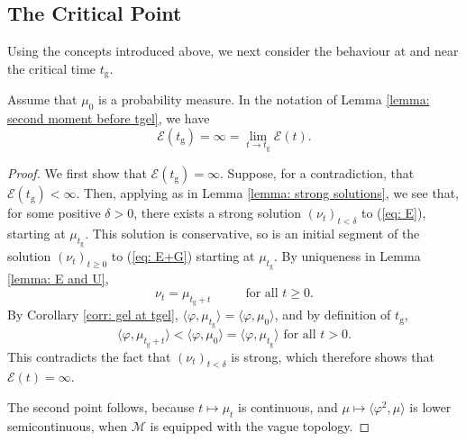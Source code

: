 \subsection{The Critical Point} Using the concepts introduced above, we next consider the behaviour at and near the critical time $t_\mathrm{g}$. \begin{lemma} Assume that $\mu_0$ is a probability measure. In the notation of Lemma \ref{lemma: second moment before tgel}, we have \begin{equation} \mathcal{E}(t_\mathrm{g})=\infty=\lim_{t\rightarrow t_\mathrm{g}} \mathcal{E}(t). \end{equation} \end{lemma} 
\begin{proof}We first show that $\mathcal{E}(t_\mathrm{g})=\infty$. Suppose, for a contradiction, that $\mathcal{E}(t_\mathrm{g})<\infty.$ Then, applying \cite[Proposition 2.7]{N00} as in Lemma \ref{lemma: strong solutions}, we see that, for some positive $\delta>0$, there exists a strong solution $(\nu_t)_{t<\delta}$ to (\ref{eq: E}), starting at $\mu_{t_\mathrm{g}}.$ This solution is conservative, so is an initial segment of the solution $(\nu_t)_{t\ge 0}$ to (\ref{eq: E+G}) starting at $\mu_{ t_\mathrm{g}}$. By uniqueness in Lemma \ref{lemma: E and U}, \begin{equation}
    \nu_t=\mu_{t_\mathrm{g}+t} \hspace{1cm} \text{ for all }t\ge 0.
\end{equation}
By Corollary \ref{corr: gel at tgel}, $\langle \varphi, \mu_{t_\mathrm{g}}\rangle = \langle \varphi, \mu_0\rangle$, and by definition of $t_\mathrm{g}$, \begin{equation} \langle \varphi, \mu_{t_\mathrm{g}+t}\rangle < \langle \varphi, \mu_{0}\rangle = \langle \varphi, \mu_{t_\mathrm{g}}\rangle \text{ for all }t>0. \end{equation}This contradicts the fact that $(\nu_t)_{t<\delta}$ is strong, which therefore shows that $\mathcal{E}(t)=\infty$.

The second point follows, because $t\mapsto \mu_t$ is continuous, and $\mu \mapsto \langle \varphi^2, \mu\rangle$ is lower semicontinuous, when $\mathcal{M}$
is equipped with the vague topology. \end{proof}

